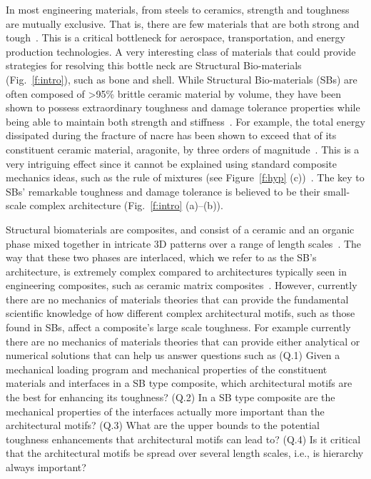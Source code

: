 \documentclass[10pt,letterpaper]{article}
\begin{document}
 In most engineering materials, from steels to ceramics, strength and toughness are mutually exclusive. That is, there are few materials that are both strong and tough~\cite{ritchie2011conflicts}. This is a critical bottleneck for aerospace, transportation, and energy production technologies. A very interesting class of materials that could provide  strategies for resolving this bottle neck are Structural Bio-materials (Fig.~\ref{f:intro}), such as bone and shell.  While Structural Bio-materials (SBs) are often composed of >95\% brittle ceramic material by volume, they have been shown to possess extraordinary toughness and damage tolerance properties while being able to maintain both strength and stiffness~\cite{barthelat2011toughness,rabiei2012nacre,currey2003well,wang2001deformation}. For example, the total energy dissipated during the fracture of nacre has been shown to exceed that of its constituent ceramic material, aragonite, by three orders of magnitude~\cite{currey1976further,Currey:1977wf}.  This is a very intriguing effect since it cannot be explained using standard composite mechanics ideas, such as the rule of mixtures (see Figure~\ref{f:hyp} (c))~\cite{wegst2015bioinspired}. The key to SBs' remarkable toughness and damage tolerance is believed to be their small-scale complex architecture (Fig.~\ref{f:intro} (a)--(b)).

 Structural biomaterials  are composites, and consist of a ceramic and an organic phase mixed together in intricate 3D patterns over a range of length scales~\cite{mayer2005rigid,meyers2013structural}. The way that these two phases are interlaced, which we refer to as the SB's architecture, is extremely complex compared to architectures typically seen in engineering composites, such as ceramic matrix composites~\cite{padture2002thermal,zhu2004development}.  However, currently there are no  mechanics of materials theories that can provide the fundamental scientific  knowledge  of  how different complex architectural motifs, such as those found in SBs,  affect a  composite's large scale toughness. For example currently  there are no mechanics of materials theories that can provide either analytical or numerical solutions that can help us  answer questions such as (Q.1) Given a mechanical loading program and mechanical  properties of the constituent materials  and interfaces in a SB type composite, which  architectural motifs are the best for enhancing its toughness? (Q.2) In a  SB type composite are the  mechanical properties of  the interfaces actually more important than the architectural motifs?  (Q.3) What are the  upper bounds to the potential toughness enhancements that architectural motifs can lead to?   (Q.4) Is it critical that the architectural motifs  be spread over several length scales, i.e., is hierarchy always important?
\end{document}
